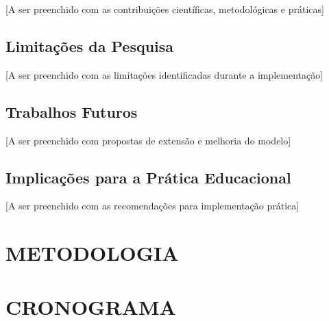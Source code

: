\documentclass[12pt,a4paper]{article}
\begin{document}
[A ser preenchido com as contribuições científicas, metodológicas e práticas]

\subsection{Limitações da Pesquisa}

[A ser preenchido com as limitações identificadas durante a implementação]

\subsection{Trabalhos Futuros}

[A ser preenchido com propostas de extensão e melhoria do modelo]

\subsection{Implicações para a Prática Educacional}

[A ser preenchido com as recomendações para implementação prática]

\section{METODOLOGIA}


\section{CRONOGRAMA}


\def\refname{REFERÊNCIAS BIBLIOGRÁFICAS}


\end{document}
